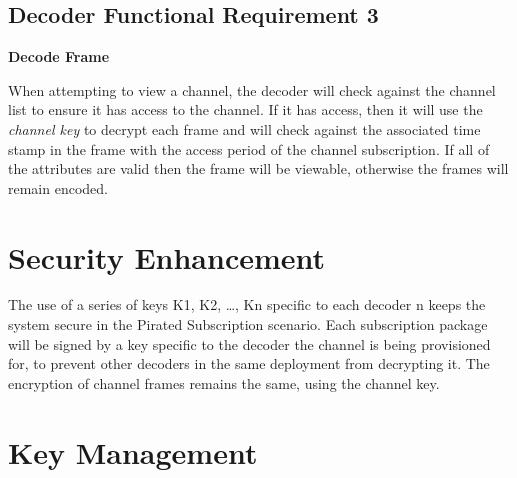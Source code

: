 \documentclass[12pt]{article}
\begin{document}
\subsection*{Decoder Functional Requirement 3}
\textbf{Decode Frame}

When attempting to view a channel, the decoder will check against the channel list to ensure it has access to the channel. If it has access, then it will use the \textit{channel key} to decrypt each frame and will check against the associated time stamp in the frame with the access period of the channel subscription. If all of the attributes are valid then the frame will be viewable, otherwise the frames will remain encoded.

\section*{Security Enhancement}
The use of a series of keys K1, K2, \ldots, Kn specific to each decoder n keeps the system secure in the Pirated Subscription scenario. Each subscription package will be signed by a key specific to the decoder the channel is being provisioned for, to prevent other decoders in the same deployment from decrypting it. The encryption of channel frames remains the same, using the channel key.

\section*{Key Management}
\end{document}
